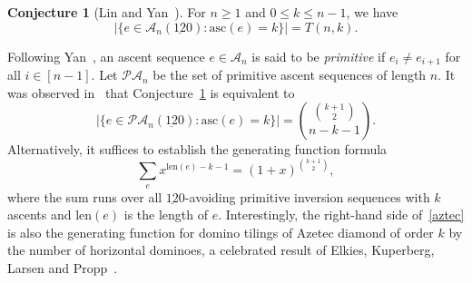 \documentclass[12pt,A4]{amsart}
\numberwithin{equation}{section}
\theoremstyle{plain}
\theoremstyle{definition}
\newtheorem{conjecture}[theorem]{Conjecture}
\def\A{\mathcal{A}}
\def\PA{\mathcal{PA}}
\def\len{\mathrm{len}}
\def\asc{\mathrm{asc}}
\begin{document}
\begin{conjecture}[Lin and Yan~]\label{asc:12-0}
For $n\geq1$ and $0\leq k\leq n-1$, we have
$$
|\{e\in\A_n(\underline{12}0):\asc(e)=k\}|=T(n,k).
$$
\end{conjecture}

Following Yan~\cite{yan0}, an ascent sequence $e\in\A_n$ is said to be {\em primitive} if $e_i\neq e_{i+1}$ for all $i\in[n-1]$. Let $\PA_n$ be the set of primitive ascent sequences of length $n$. It was observed in~\cite{ly} that Conjecture~\ref{asc:12-0} is equivalent to 
\begin{equation}\label{PA:12-0}
|\{e\in\PA_n(\underline{12}0):\asc(e)=k\}|=\binom{\binom{k+1}{2}}{n-k-1}.
\end{equation}
Alternatively, it suffices to establish the generating function formula
\begin{equation}\label{aztec}
\sum_{e}x^{\len(e)-k-1}=(1+x)^{{k+1\choose2}}, 
\end{equation}
where the sum runs over all $\underline{12}0$-avoiding primitive inversion sequences with $k$ ascents and $\len(e)$ is the length of $e$. Interestingly,  the right-hand side of~\eqref{aztec} is also the generating function for domino tilings of Azetec diamond of order $k$ by the number of  horizontal dominoes, a celebrated  result of Elkies, Kuperberg, Larsen and Propp~\cite{eklp}.
\end{document}
